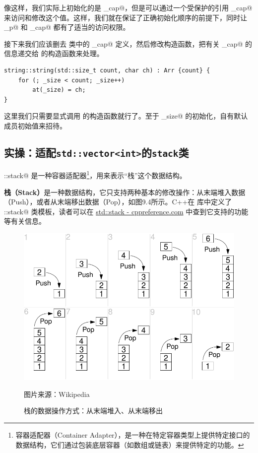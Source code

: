 像这样，我们实际上初始化的是 \lstinline@ori_cap@，但是可以通过一个受保护的引用 \lstinline@_cap@ 来访问和修改这个值。这样，我们就在保证了正确初始化顺序的前提下，同时让 \lstinline@_p@ 和 \lstinline@_cap@ 都有了适当的访问权限。\par
接下来我们应该删去 \lstinline@string@ 类中的 \lstinline@_cap@ 定义，然后修改构造函数，把有关 \lstinline@_cap@ 的信息递交给 \lstinline@Arr@ 的构造函数来处理。
\begin{lstlisting}
string::string(std::size_t count, char ch) : Arr {count} {
    for (; _size < count; _size++)
        at(_size) = ch;
}
\end{lstlisting}
这里我们只需要显式调用 \lstinline@Arr@ 的构造函数就行了。至于 \lstinline@_size@ 的初始化，自有默认成员初始值来招待。\par
\subsection*{实操：适配\texttt{std::vector<int>}的\texttt{stack}类}
\lstinline@std::stack@ 是一种容器适配器\footnote{容器适配器（Container Adapter），是一种在特定容器类型上提供特定接口的数据结构，它们通过包装底层容器（如数组或链表）来提供特定的功能。}，用来表示``栈''这个数据结构。\par
\textbf{栈（Stack）}是一种数据结构，它只支持两种基本的修改操作：从末端堆入数据（Push），或者从末端移出数据（Pop），如图9.4所示。C++在 \lstinline@stack@ 库中定义了 \lstinline@std::stack@ 类模板，读者可以在 \href{https://en.cppreference.com/w/cpp/container/stack}{std::stack - cppreference.com} 中查到它支持的功能等有关信息。
\begin{figure}[htbp]
    \centering
    \includegraphics[width=.75\textwidth]{../images/generalized_parts/09_lifo_stack.png}
    \caption{栈的数据操作方式：从末端堆入、从末端移出}
    \footnotesize{图片来源：Wikipedia}
\end{figure}
